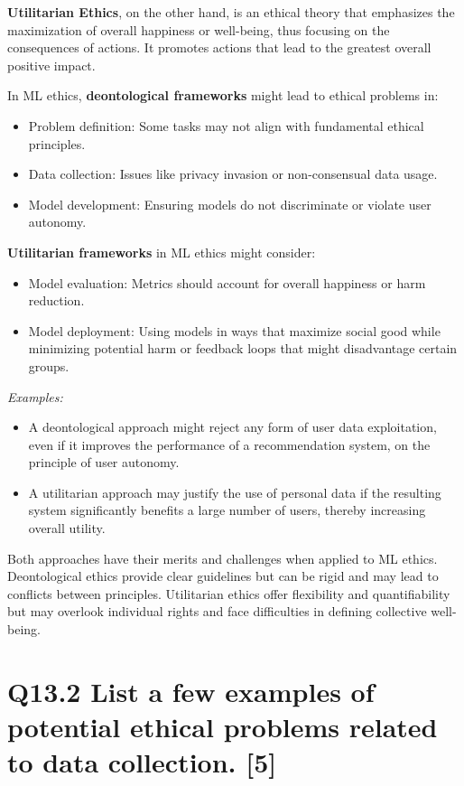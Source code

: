 \documentclass[11pt]{article}
\begin{document}
\textbf{Utilitarian Ethics}, on the other hand, is an ethical theory that emphasizes the maximization of overall happiness or well-being, thus focusing on the consequences of actions. It promotes actions that lead to the greatest overall positive impact.

In ML ethics, \textbf{deontological frameworks} might lead to ethical problems in:
\begin{itemize}
    \item Problem definition: Some tasks may not align with fundamental ethical principles.
    \item Data collection: Issues like privacy invasion or non-consensual data usage.
    \item Model development: Ensuring models do not discriminate or violate user autonomy.
\end{itemize}

\textbf{Utilitarian frameworks} in ML ethics might consider:
\begin{itemize}
    \item Model evaluation: Metrics should account for overall happiness or harm reduction.
    \item Model deployment: Using models in ways that maximize social good while minimizing potential harm or feedback loops that might disadvantage certain groups.
\end{itemize}

\textit{Examples:}
\begin{itemize}
    \item A deontological approach might reject any form of user data exploitation, even if it improves the performance of a recommendation system, on the principle of user autonomy.
    \item A utilitarian approach may justify the use of personal data if the resulting system significantly benefits a large number of users, thereby increasing overall utility.
\end{itemize}

Both approaches have their merits and challenges when applied to ML ethics. Deontological ethics provide clear guidelines but can be rigid and may lead to conflicts between principles. Utilitarian ethics offer flexibility and quantifiability but may overlook individual rights and face difficulties in defining collective well-being.

\section{Q13.2 List a few examples of potential ethical problems related to data collection. [5]}
\end{document}

